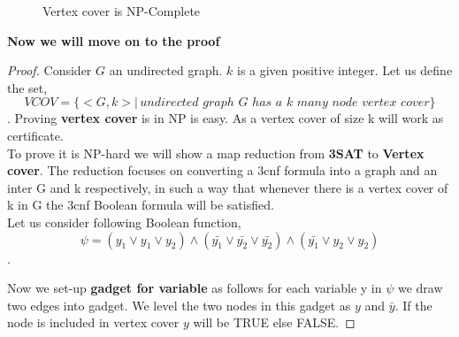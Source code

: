 \documentclass[12pt,a4paper,final]{article}
\theoremstyle{definition}
\begin{document}
\begin{enumerate}
\begin{enumerate}
\begin{figure}[H]


\caption{Vertex cover is NP-Complete}
\label{fig:9b}
\end{figure}




\textbf{Now we will move on to the proof}
\begin{proof}
Consider $G$ an undirected graph. $k$ is a given positive integer. Let us define the set, $$VCOV = \{<G,k>|\,undirected\,\, graph\, \,G \,\,has\,\, a\,\, k\,\, many\,\, node\,\, vertex \,\,cover\}$$.
Proving \textbf{vertex cover} is in NP is easy. As a vertex cover of size k will work as certificate.\\

To prove it is NP-hard we will show a map reduction from \textbf{3SAT} to \textbf{Vertex cover}. The reduction focuses on converting a 3cnf formula into a graph and an inter G and k respectively, in such a way that whenever there is a vertex cover of k in G the 3cnf Boolean formula will be satisfied.\\

Let us consider following Boolean function,\\
$$\psi = (y_1 \lor y_1 \lor y_2) \land (\bar{y_1} \lor \bar{y_2} \lor \bar{y_2}) \land (\bar{y_1} \lor y_2 \lor y_2)$$.

Now we set-up \textbf{gadget for variable} as follows for each variable y in $\psi$ we draw two edges into gadget. We level the two nodes in this gadget as $y$ and $\bar{y}$. If the node is included in vertex cover $y$ will be TRUE else FALSE.


\end{proof}
\end{enumerate}
\end{enumerate}
\end{document}
